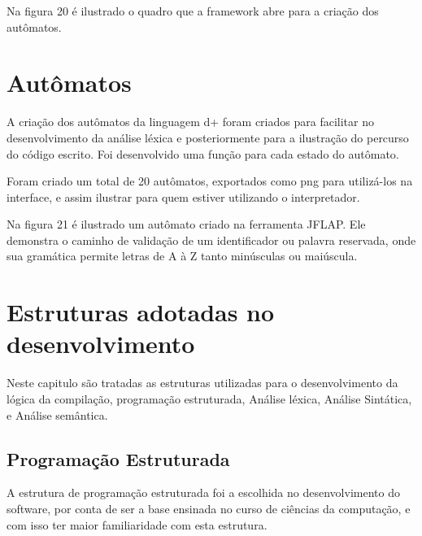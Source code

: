 \documentclass[12pt,oneside,a4paper,chapter=TITLE,section=TITLE,sumario=tradicional]{abntex2}
\begin{document}
Na figura 20 é ilustrado o quadro que a framework abre para a criação dos autômatos.

\begin{figure}[htb]
\end{figure}

\section{Autômatos}
\label{sec:automatosmet}

A criação dos autômatos da linguagem d+ foram criados para facilitar no desenvolvimento da análise léxica e posteriormente para a ilustração do percurso do código escrito. Foi desenvolvido uma função para cada estado do autômato.

Foram criado um total de 20 autômatos, exportados como png para utilizá-los na interface, e assim ilustrar para quem estiver utilizando o interpretador.

Na figura 21 é ilustrado um autômato criado na ferramenta JFLAP. Ele demonstra o caminho de validação de um identificador ou palavra reservada, onde sua gramática permite letras de A à Z tanto minúsculas ou maiúscula.

\begin{figure}[htb]
\end{figure}

\section{Estruturas adotadas no desenvolvimento}
\label{sec:estruturasadotadas}

Neste capitulo são tratadas as estruturas utilizadas para o desenvolvimento da lógica da compilação, programação estruturada, Análise léxica, Análise Sintática, e Análise semântica.

\subsection{Programação Estruturada}
\label{subsec:programacaoestruturada}

A estrutura de programação estruturada foi a escolhida no desenvolvimento do software, por conta de ser a base ensinada no curso de ciências da computação, e com isso ter maior familiaridade com esta estrutura.
\end{document}
